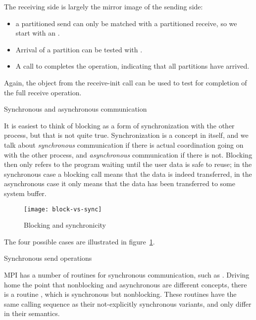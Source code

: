 \begin{mpifour}

The receiving side is largely the mirror image of the sending side:
\begin{itemize}
\item a partitioned send can only be matched with a partitioned receive,
  so we start with an . 
\item Arrival of a partition can be tested with .
\item A call to  completes the operation,
  indicating that all partitions have arrived.
\end{itemize}
Again, the  object from the receive-init call can
be used to test for completion of the full receive operation.


\end{mpifour}

 {Synchronous and asynchronous communication}

It is easiest to think of blocking as a form of synchronization with
the other process, but that is not quite true. Synchronization is a
concept in itself, and we talk about \emph{synchronous} communication
if there is actual coordination going on with the other process,
and \emph{asynchronous} communication if there is not. Blocking then
only refers to the program waiting until the user data is safe
to reuse; in the synchronous case a blocking call means that the data
is indeed transferred, in the asynchronous case it only means that the
data has been transferred to some system buffer.
%
\begin{figure}[ht]
\texttt{[image: block-vs-sync]}
\caption{Blocking and synchronicity}
\label{fig:block-sync}
\end{figure}
The four possible cases are illustrated in figure~\ref{fig:block-sync}.

 {Synchronous send operations}
\label{sec:syncsend}

MPI has a number of routines for synchronous communication,
such as .
Driving home the point that nonblocking and asynchronous are
different concepts, there is a routine ,
which is synchronous but nonblocking.
These routines have the same calling sequence as their not-explicitly
synchronous variants, and only differ in their semantics.

